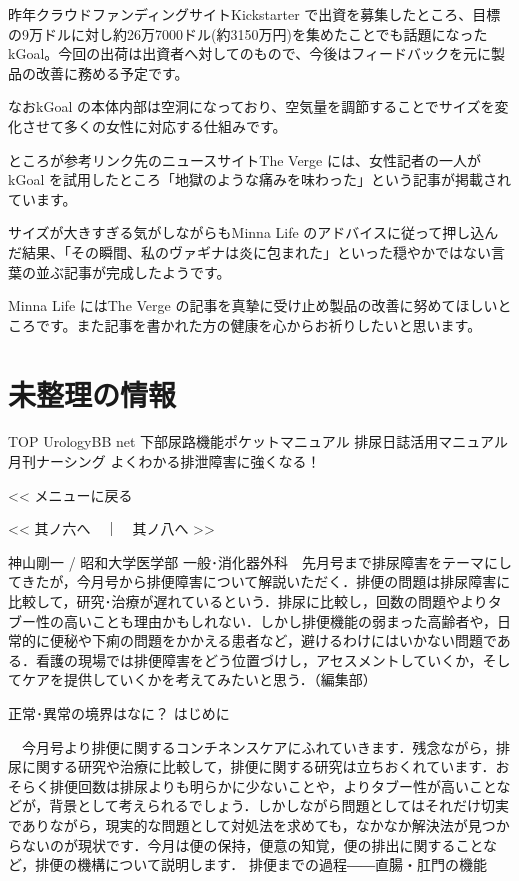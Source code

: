 昨年クラウドファンディングサイトKickstarter で出資を募集したところ、目標の9万ドルに対し約26万7000ドル(約3150万円)を集めたことでも話題になったkGoal。今回の出荷は出資者へ対してのもので、今後はフィードバックを元に製品の改善に務める予定です。


なおkGoal の本体内部は空洞になっており、空気量を調節することでサイズを変化させて多くの女性に対応する仕組みです。

ところが参考リンク先のニュースサイトThe Verge には、女性記者の一人がkGoal を試用したところ「地獄のような痛みを味わった」という記事が掲載されています。

サイズが大きすぎる気がしながらもMinna Life のアドバイスに従って押し込んだ結果、「その瞬間、私のヴァギナは炎に包まれた」といった穏やかではない言葉の並ぶ記事が完成したようです。

Minna Life にはThe Verge の記事を真摯に受け止め製品の改善に努めてほしいところです。また記事を書かれた方の健康を心からお祈りしたいと思います。 


\section{未整理の情報}

	
	
TOP 	UrologyBB net 	下部尿路機能ポケットマニュアル 	排尿日誌活用マニュアル 	月刊ナーシング よくわかる排泄障害に強くなる！

<< メニューに戻る
	

<< 其ノ六へ　｜　其ノ八へ >>

神山剛一 / 昭和大学医学部 一般･消化器外科　先月号まで排尿障害をテーマにしてきたが，今月号から排便障害について解説いただく．排便の問題は排尿障害に比較して，研究･治療が遅れているという．排尿に比較し，回数の問題やよりタブー性の高いことも理由かもしれない．しかし排便機能の弱まった高齢者や，日常的に便秘や下痢の問題をかかえる患者など，避けるわけにはいかない問題である．看護の現場では排便障害をどう位置づけし，アセスメントしていくか，そしてケアを提供していくかを考えてみたいと思う．（編集部）
 
正常･異常の境界はなに？
はじめに

　今月号より排便に関するコンチネンスケアにふれていきます．残念ながら，排尿に関する研究や治療に比較して，排便に関する研究は立ちおくれています．おそらく排便回数は排尿よりも明らかに少ないことや，よりタブー性が高いことなどが，背景として考えられるでしょう．しかしながら問題としてはそれだけ切実でありながら，現実的な問題として対処法を求めても，なかなか解決法が見つからないのが現状です．今月は便の保持，便意の知覚，便の排出に関することなど，排便の機構について説明します．
排便までの過程――直腸・肛門の機能


